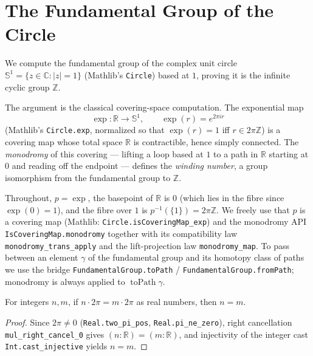 


\section{The Fundamental Group of the Circle}

We compute the fundamental group of the complex unit circle
\(\mathbb{S}^1 = \{z \in \mathbb{C} : |z| = 1\}\) (Mathlib's \texttt{Circle}) based at
\(1\), proving it is the infinite cyclic group \(\mathbb{Z}\).

The argument is the classical covering-space computation. The exponential map
\[
  \exp : \mathbb{R} \to \mathbb{S}^1, \qquad \exp(r) = e^{2\pi i r}
\]
(Mathlib's \texttt{Circle.exp}, normalized so that \(\exp(r) = 1\) iff
\(r \in 2\pi\mathbb{Z}\)) is a covering map whose total space \(\mathbb{R}\) is
contractible, hence simply connected. The \emph{monodromy} of this covering --- lifting
a loop based at \(1\) to a path in \(\mathbb{R}\) starting at \(0\) and reading off the
endpoint --- defines the \emph{winding number}, a group isomorphism from the fundamental
group to \(\mathbb{Z}\).

Throughout, \(p = \exp\), the basepoint of \(\mathbb{R}\) is \(0\) (which lies in the fibre
since \(\exp(0) = 1\)), and the fibre over \(1\) is \(p^{-1}(\{1\}) = 2\pi\mathbb{Z}\).
We freely use that \(p\) is a covering map (Mathlib: \texttt{Circle.isCoveringMap\_exp}) and
the monodromy API \texttt{IsCoveringMap.monodromy} together with its compatibility law
\texttt{monodromy\_trans\_apply} and the lift-projection law \texttt{monodromy\_map}. To pass
between an element \(\gamma\) of the fundamental group and its homotopy class of paths we use
the bridge \texttt{FundamentalGroup.toPath} / \texttt{FundamentalGroup.fromPath}; monodromy is
always applied to \(\operatorname{toPath}\gamma\).

\begin{lemma}
    \label{lem:two-pi-cancel}
    \leanok
    For integers \(n, m\), if \(n \cdot 2\pi = m \cdot 2\pi\) as real numbers, then \(n = m\).
\end{lemma}
\begin{proof}
    Since \(2\pi \neq 0\) (\texttt{Real.two\_pi\_pos}, \texttt{Real.pi\_ne\_zero}), right
    cancellation \texttt{mul\_right\_cancel\_0} gives \((n : \mathbb{R}) = (m : \mathbb{R})\), and
    injectivity of the integer cast \texttt{Int.cast\_injective} yields \(n = m\).
\end{proof}

